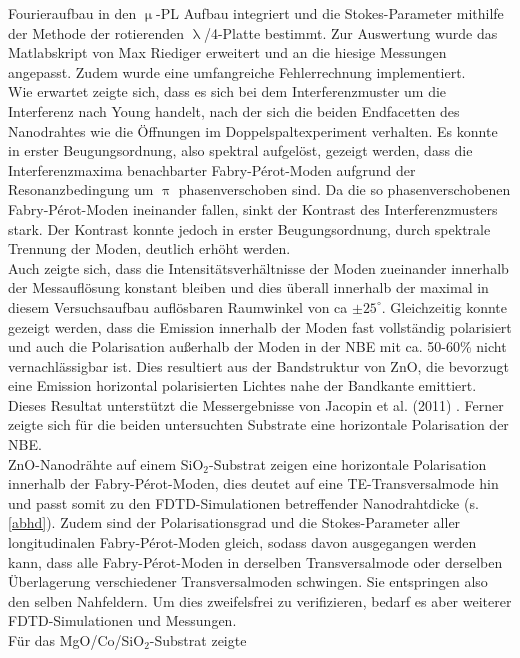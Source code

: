 Fourieraufbau in den $\upmu$-PL Aufbau integriert und die Stokes-Parameter
mithilfe der Methode der rotierenden $\uplambda$/4-Platte bestimmt. Zur
Auswertung wurde das Matlabskript von Max Riediger \cite{Riediger.Master}
erweitert und an die hiesige Messungen angepasst. Zudem wurde eine umfangreiche
Fehlerrechnung implementiert.\\ Wie erwartet zeigte sich, dass es sich bei dem
Interferenzmuster um die Interferenz nach Young handelt, nach der sich die
beiden Endfacetten des Nanodrahtes wie die Öffnungen im Doppelspaltexperiment
verhalten. Es konnte in erster Beugungsordnung, also spektral aufgelöst, gezeigt
werden, dass die Interferenzmaxima benachbarter Fabry-Pérot-Moden aufgrund der
Resonanzbedingung um $\uppi$ phasenverschoben sind. Da die so phasenverschobenen
Fabry-Pérot-Moden ineinander fallen, sinkt der Kontrast des Interferenzmusters
stark. Der Kontrast konnte jedoch in erster Beugungsordnung, durch spektrale
Trennung der Moden, deutlich erhöht werden.\\ Auch zeigte sich, dass die
Intensitätsverhältnisse der Moden zueinander innerhalb der Messauflösung
konstant bleiben und dies überall innerhalb der maximal in diesem Versuchsaufbau
auflösbaren Raumwinkel von ca $\pm \text{25}^\circ$. Gleichzeitig konnte gezeigt
werden, dass die Emission innerhalb der Moden fast vollständig polarisiert und
auch die Polarisation außerhalb der Moden in der NBE mit ca. 50-60\% nicht
vernachlässigbar ist. Dies resultiert aus der Bandstruktur von ZnO, die
bevorzugt eine Emission horizontal polarisierten Lichtes nahe der Bandkante
emittiert. Dieses Resultat unterstützt die Messergebnisse von Jacopin et al.
(2011) \cite{Jacopin.2011}. Ferner zeigte sich für die beiden untersuchten
Substrate eine horizontale Polarisation der NBE.\\ ZnO-Nanodrähte auf einem
SiO$_\text{2}$-Substrat zeigen eine horizontale Polarisation innerhalb der
Fabry-Pérot-Moden, dies deutet auf eine TE-Transversalmode hin und passt somit
zu den FDTD-Simulationen betreffender Nanodrahtdicke (s. \autoref{abhd}). Zudem
sind der Polarisationsgrad und die Stokes-Parameter aller longitudinalen
Fabry-Pérot-Moden gleich, sodass davon ausgegangen werden kann, dass alle
Fabry-Pérot-Moden in derselben Transversalmode oder derselben Überlagerung
verschiedener Transversalmoden schwingen. Sie entspringen also den selben
Nahfeldern. Um dies zweifelsfrei zu verifizieren, bedarf es aber weiterer
FDTD-Simulationen und Messungen.\\ Für das MgO/Co/SiO$_\text{2}$-Substrat zeigte
